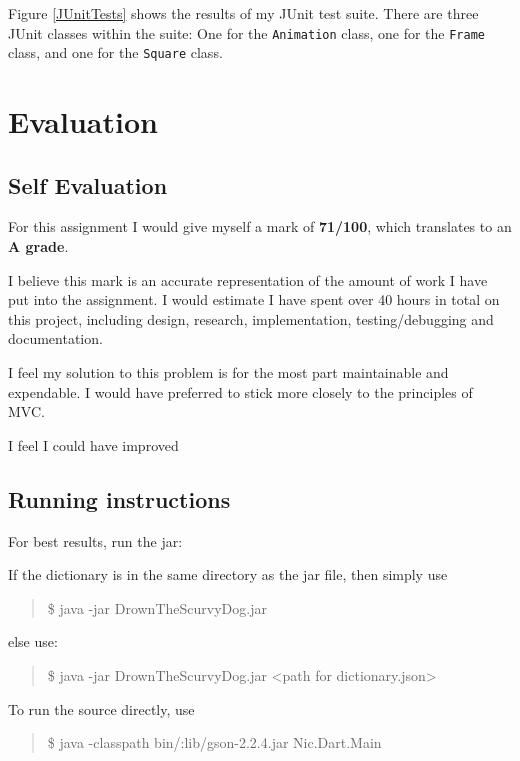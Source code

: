 \documentclass[a4paper, 11pt]{article}
\begin{document}
Figure \ref{JUnitTests} shows the results of my JUnit test suite. There are three JUnit classes within the suite: One for the \texttt{Animation} class, one for the \texttt{Frame} class, and one for the \texttt{Square} class.

\newpage

\section{Evaluation}

\subsection{Self Evaluation}

For this assignment I would give myself a mark of \textbf{71/100}, which translates to an \textbf{A grade}.

I believe this mark is an accurate representation of the amount of work I have put into the assignment. I would estimate I have spent over 40 hours in total on this project, including design, research, implementation, testing/debugging and documentation.

I feel my solution to this problem is for the most part maintainable and expendable. I would have preferred to stick more closely to the principles of MVC. 

I feel I could have improved 

\subsection{Running instructions}

For best results, run the jar:

If the dictionary is in the same directory as the jar file, then simply use
\begin{quote}
\$ java -jar DrownTheScurvyDog.jar
\end{quote}

else use:
\begin{quote}
\$ java -jar DrownTheScurvyDog.jar \textless path for dictionary.json\textgreater
\end{quote}

To run the source directly, use
\begin{quote}
\$ java -classpath bin/:lib/gson-2.2.4.jar Nic.Dart.Main
\end{quote}




\vspace{\baselineskip}
\end{document}
